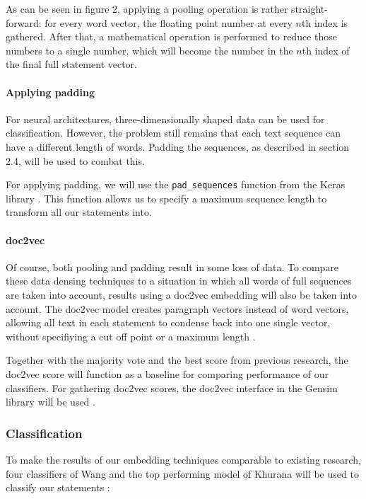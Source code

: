 As can be seen in figure 2, applying a pooling operation is rather straight-forward: for every word vector, the floating point number at every $n$th index is gathered.
After that, a mathematical operation is performed to reduce those numbers to a single number, which will become the number in the $n$th index of the final full statement vector.

\paragraph{Applying padding}
For neural architectures, three-dimensionally shaped data can be used for classification. 
However, the problem still remains that each text sequence can have a different length of words. 
Padding the sequences, as described in section 2.4, will be used to combat this.

For applying padding, we will use the \texttt{pad\_sequences} function from the Keras library \cite{keraspad}. 
This function allows us to specify a maximum sequence length to transform all our statements into.

\paragraph{doc2vec}
Of course, both pooling and padding result in some loss of data.
To compare these data densing techniques to a situation in which all words of full sequences are taken into account, results using a doc2vec embedding will also be taken into account.
The doc2vec model creates paragraph vectors instead of word vectors, allowing all text in each statement to condense back into one single vector, without specifiying a cut off point or a maximum length \cite{le2014}.

Together with the majority vote and the best score from previous research, the doc2vec score will function as a baseline for comparing performance of our classifiers.
For gathering doc2vec scores, the doc2vec interface in the Gensim library will be used \cite{gensim}. 

\subsubsection{Classification}
To make the results of our embedding techniques comparable to existing research, four classifiers of Wang and the top performing model of Khurana will be used to classify our statements \cite{wang2018}\cite{khurana2017}:

